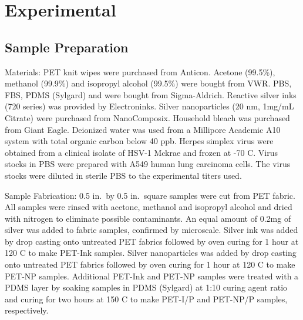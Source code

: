 \documentclass[journal=jacsat,manuscript=article]{achemso}
\begin{document}

\section{Experimental}


\subsection{Sample Preparation}
Materials: PET knit wipes were purchased from Anticon. Acetone (99.5\%), methanol (99.9\%) and isopropyl alcohol (99.5\%) were bought from VWR.  PBS, FBS, PDMS (Sylgard) and were bought from Sigma-Aldrich. Reactive silver inks (720 series) was provided by Electroninks. Silver nanoparticles (20 nm, 1mg/mL Citrate) were purchased from NanoComposix. Household bleach was purchased from Giant Eagle. Deionized water was used from a Millipore Academic A10 system with total organic carbon below 40 ppb. Herpes simplex virus were obtained from a clinical isolate of HSV-1 Mckrae and frozen at -70 \degree C. Virus stocks in PBS were prepared with A549 human lung carcinoma cells. The virus stocks were diluted in sterile PBS to the experimental titers used.

Sample Fabrication: 0.5 in.~by 0.5 in.~square samples were cut from PET fabric. All samples were rinsed with acetone, methanol and isopropyl alcohol and dried with nitrogen to eliminate possible contaminants. An equal amount of 0.2mg of silver was added to fabric samples, confirmed by microscale. Silver ink was added by drop casting onto untreated PET fabrics followed by oven curing for 1 hour at 120 \degree C to make PET-Ink samples. Silver nanoparticles was added by drop casting onto untreated PET fabrics followed by oven curing for 1 hour at 120 \degree C to make PET-NP samples. Additional PET-Ink and PET-NP samples were treated with a PDMS layer by soaking samples in PDMS (Sylgard) at 1:10 curing agent  ratio and curing for two hours at 150 \degree C to make PET-I/P and PET-NP/P samples, respectively. 
\end{document}
